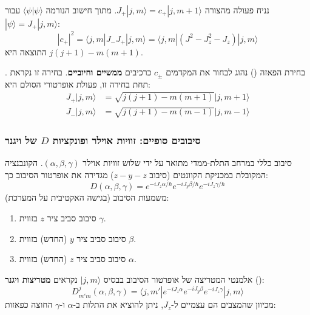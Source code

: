 נניח פעולה מהצורה $J_+ |j,m\rangle = c_+ |j,m+1\rangle$. מתוך חישוב הנורמה $\langle \psi | \psi \rangle$ עבור $|\psi\rangle = J_+ |j,m\rangle$:
\begin{equation}
    |c_+|^2 = \langle j,m | J_- J_+ | j,m \rangle = \langle j,m | (J^2 - J_z^2 - J_z) | j,m \rangle
\end{equation}
התוצאה היא $j(j+1) - m(m+1)$.

\begin{definitionbox}{בחירת הפאזה ()}
נהוג לבחור את המקדמים $c_\pm$ כרכיבים \textbf{ממשיים וחיוביים}. בחירה זו נקראת . תחת בחירה זו, פעולת אופרטורי הסולם היא:
\begin{align}
    J_+ |j,m\rangle &= \sqrt{j(j+1) - m(m+1)} |j,m+1\rangle \\
    J_- |j,m\rangle &= \sqrt{j(j+1) - m(m-1)} |j,m-1\rangle
\end{align}
\end{definitionbox}

\subsubsection{סיבובים סופיים: זוויות אוילר ופונקציות $D$ של ויגנר}
סיבוב כללי במרחב התלת-ממדי מתואר על ידי שלוש זוויות אוילר $(\alpha, \beta, \gamma)$. הקונבנציה המקובלת במכניקת הקוונטים (סיבוב $z-y-z$) מגדירה את אופרטור הסיבוב כך:
\begin{equation}
    D(\alpha, \beta, \gamma) = e^{-i J_z \alpha / \hbar} e^{-i J_y \beta / \hbar} e^{-i J_z \gamma / \hbar}
\end{equation}
משמעות הסיבוב (בגישה האקטיבית על המערכת):
\begin{enumerate}
    \item סיבוב סביב ציר $z$ בזווית $\gamma$.
    \item סיבוב סביב ציר $y$ (החדש) בזווית $\beta$.
    \item סיבוב סביב ציר $z$ (החדש) בזווית $\alpha$.
\end{enumerate}



אלמנטי המטריצה של אופרטור הסיבוב בבסיס $|j,m\rangle$ נקראים \textbf{מטריצות ויגנר} ():
\begin{equation}
    D^j_{m'm}(\alpha, \beta, \gamma) = \langle j,m' | e^{-i J_z \alpha} e^{-i J_y \beta} e^{-i J_z \gamma} | j,m \rangle
\end{equation}
מכיוון שהמצבים הם עצמיים ל-$J_z$, ניתן להוציא את התלות ב-$\alpha$ ו-$\gamma$ החוצה כפאזות:

